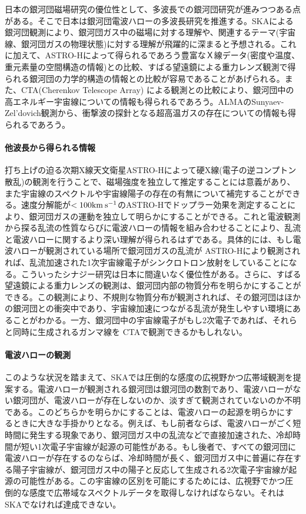 日本の銀河団磁場研究の優位性として、多波長での銀河団研究が進みつつある点がある。そこで日本は銀河団電波ハローの多波長研究を推進する。SKAによる銀河団観測により、銀河団ガス中の磁場に対する理解や、関連するテーマ(宇宙線、銀河団ガスの物理状態)に対する理解が飛躍的に深まると予想される。これに加えて、ASTRO-Hによって得られるであろう豊富なＸ線データ(密度や温度、重元素量の空間構造の情報)との比較、すばる望遠鏡による重力レンズ観測で得られる銀河団の力学的構造の情報との比較が容易であることがあげられる。また、CTA(Cherenkov Telescope Array) による観測との比較により、銀河団中の高エネルギー宇宙線についての情報も得られるであろう。ALMAのSunyaev-Zel'dovich観測から、衝撃波の探針となる超高温ガスの存在についての情報も得られるであろう。

\paragraph{他波長から得られる情報}

打ち上げの迫る次期X線天文衛星ASTRO-Hによって硬X線(電子の逆コンプトン散乱)の観測を行うことで、磁場強度を独立して推定することには意義があり、また宇宙線のスペクトルや宇宙線陽子の存在の有無について補完することができる。速度分解能が$<100\rm km\: s^{-1}$のASTRO-Hでドップラー効果を測定することにより、銀河団ガスの運動を独立して明らかにすることができる。これと電波観測から探る乱流の性質ならびに電波ハローの情報を組み合わせることにより、乱流と電波ハローに関するより深い理解が得られるはずである。具体的には、もし電波ハローが観測されている場所で銀河団ガスの乱流が ASTRO-Hにより観測されれば、乱流加速された1次宇宙線電子がシンクロトロン放射をしていることになる。こういったシナジー研究は日本に間違いなく優位性がある。さらに、すばる望遠鏡による重力レンズの観測は、銀河団内部の物質分布を明らかにすることができる。この観測により、不規則な物質分布が観測されれば、その銀河団はほかの銀河団との衝突中であり、宇宙線加速につながる乱流が発生しやすい環境にあることがわかる。一方、銀河団中の宇宙線電子がもし2次電子であれば、それらと同時に生成されるガンマ線を CTAで観測できるかもしれない。

\paragraph{電波ハローの観測}

このような状況を踏まえて、SKAでは圧倒的な感度の広視野かつ広帯域観測を提案する。電波ハローが観測される銀河団は銀河団の数割であり、電波ハローがない銀河団が、電波ハローが存在しないのか、淡すぎて観測されていないのか不明である。このどちらかを明らかにすることは、電波ハローの起源を明らかにするときに大きな手掛かりとなる。例えば、もし前者ならば、電波ハローがごく短時間に発生する現象であり、銀河団ガス中の乱流などで直接加速された、冷却時間が短い1次電子宇宙線が起源の可能性がある\citep{2003ApJ...584..190F}。もし後者で、すべての銀河団に電波ハローが存在するのならば、冷却時間が長く、銀河団ガス中に普遍に存在する陽子宇宙線が、銀河団ガス中の陽子と反応して生成される2次電子宇宙線が起源の可能性がある\citep{2012ApJ...746...53F}。この宇宙線の区別を可能にするためには、広視野でかつ圧倒的な感度で広帯域なスペクトルデータを取得しなければならない。それはSKAでなければ達成できない。

